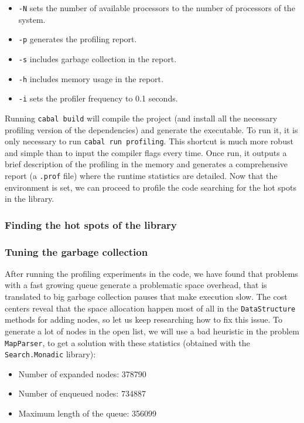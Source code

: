 \begin{itemize}
\item \texttt{-N} sets the number of available processors to the number of
  processors of the system.
\item \texttt{-p} generates the profiling report.
\item \texttt{-s} includes garbage collection in the report.
\item \texttt{-h} includes memory usage in the report.
\item \texttt{-i} sets the profiler frequency to 0.1 seconds.  
\end{itemize}

Running \texttt{cabal build} will compile the project (and install all the
necessary profiling version of the dependencies) and generate the executable.
To run it, it is only necessary to run \texttt{cabal run profiling}. This
shortcut is much more robust and simple than to input the compiler flags every
time. Once run, it outputs a brief description of the profiling in the memory
and generates a comprehensive report (a \texttt{.prof} file) where the runtime
statistics are detailed. Now that the environment is set, we can proceed to
profile the code searching for the hot spots in the library.


\subsubsection{Finding the hot spots of the library}



\subsubsection{Tuning the garbage collection}

After running the profiling experiments in the code, we have found that
problems with a fast growing queue generate a problematic space overhead, that
is translated to big garbage collection pauses that make execution slow. The
cost centers reveal that the space allocation happen most of all in the
\texttt{DataStructure} methods for adding nodes, so let us keep researching how
to fix this issue. To generate a lot of nodes in the open list, we will use a
bad heuristic in the problem \texttt{MapParser}, to get a solution with these
statistics (obtained with the \texttt{Search.Monadic} library):

\begin{itemize}
 \item Number of expanded nodes: 378790
 \item Number of enqueued nodes: 734887
 \item Maximum length of the queue: 356099
\end{itemize}

